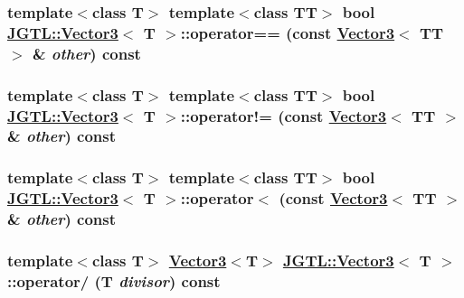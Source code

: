 \hypertarget{class_j_g_t_l_1_1_vector3_1f2bf67a285c78513498bf3533cb1c73}{
\subsubsection[operator==]{\setlength{\rightskip}{0pt plus 5cm}template$<$class T$>$ template$<$class TT$>$ bool \hyperlink{class_j_g_t_l_1_1_vector3}{JGTL::Vector3}$<$ T $>$::operator== (const \hyperlink{class_j_g_t_l_1_1_vector3}{Vector3}$<$ TT $>$ \& {\em other}) const}}
\label{class_j_g_t_l_1_1_vector3_1f2bf67a285c78513498bf3533cb1c73}


\hypertarget{class_j_g_t_l_1_1_vector3_71ba77819e5797033aabc20a74648ccf}{
\subsubsection[operator"!=]{\setlength{\rightskip}{0pt plus 5cm}template$<$class T$>$ template$<$class TT$>$ bool \hyperlink{class_j_g_t_l_1_1_vector3}{JGTL::Vector3}$<$ T $>$::operator!= (const \hyperlink{class_j_g_t_l_1_1_vector3}{Vector3}$<$ TT $>$ \& {\em other}) const}}
\label{class_j_g_t_l_1_1_vector3_71ba77819e5797033aabc20a74648ccf}


\hypertarget{class_j_g_t_l_1_1_vector3_5029ae8f779081d489063f830a6aaec7}{
\subsubsection[operator$<$]{\setlength{\rightskip}{0pt plus 5cm}template$<$class T$>$ template$<$class TT$>$ bool \hyperlink{class_j_g_t_l_1_1_vector3}{JGTL::Vector3}$<$ T $>$::operator$<$ (const \hyperlink{class_j_g_t_l_1_1_vector3}{Vector3}$<$ TT $>$ \& {\em other}) const}}
\label{class_j_g_t_l_1_1_vector3_5029ae8f779081d489063f830a6aaec7}


\hypertarget{class_j_g_t_l_1_1_vector3_022547ec36f127b76b32959d81f2c113}{
\subsubsection[operator/]{\setlength{\rightskip}{0pt plus 5cm}template$<$class T$>$ \hyperlink{class_j_g_t_l_1_1_vector3}{Vector3}$<$T$>$ \hyperlink{class_j_g_t_l_1_1_vector3}{JGTL::Vector3}$<$ T $>$::operator/ (T {\em divisor}) const}}
\label{class_j_g_t_l_1_1_vector3_022547ec36f127b76b32959d81f2c113}


